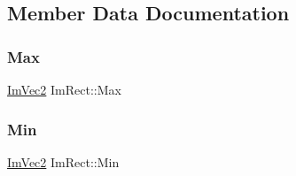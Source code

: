 \subsection{Member Data Documentation}
\hypertarget{struct_im_rect_aad58c13340d320b350a72a037e3f7628}{}\label{struct_im_rect_aad58c13340d320b350a72a037e3f7628} 
\subsubsection{\texorpdfstring{Max}{Max}}
{\footnotesize\ttfamily \hyperlink{struct_im_vec2}{Im\+Vec2} Im\+Rect\+::\+Max}

\hypertarget{struct_im_rect_af8f3fbf7ec983e03548b88e14ba68aa8}{}\label{struct_im_rect_af8f3fbf7ec983e03548b88e14ba68aa8} 
\subsubsection{\texorpdfstring{Min}{Min}}
{\footnotesize\ttfamily \hyperlink{struct_im_vec2}{Im\+Vec2} Im\+Rect\+::\+Min}

